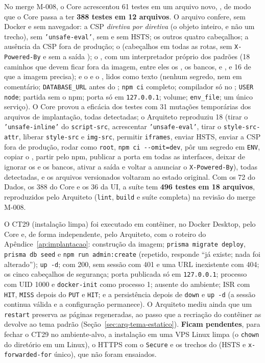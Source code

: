 No merge M-008, o Core acrescentou 61 testes em um arquivo novo, , de modo que o Core passa a ter \textbf{388 testes em 12 arquivos}. O arquivo confere, sem Docker e sem navegador: a CSP \emph{diretiva por diretiva} (o objeto inteiro, e não um trecho), sem \texttt{'unsafe-eval'}, sem  e sem HSTS; os outros quatro cabeçalhos; a ausência da CSP fora de produção; o  (cabeçalhos em todas as rotas, sem \texttt{X-Powered-By} e sem a saída ); o , com um interpretador próprio dos padrões (18 caminhos que devem ficar fora da imagem, entre eles os , os bancos,  e , e 16 de que a imagem precisa); e o  e o , lidos como texto (nenhum segredo, nem em comentário; \texttt{DATABASE\_URL} antes do ; \texttt{npm ci} completo; compilador só no ; \texttt{USER node}; partida sem o npm; porta só em \texttt{127.0.0.1}; volume; \texttt{env\_file}; um único serviço). O Core provou a eficácia dos testes com 31 mutações temporárias dos arquivos de implantação, todas detectadas; o Arquiteto reproduziu 18 (tirar o \texttt{'unsafe-inline'} do \texttt{script-src}, acrescentar \texttt{'unsafe-eval'}, tirar o \texttt{style-src-attr}, liberar \texttt{style-src} e \texttt{img-src}, permitir \texttt{iframes}, enviar HSTS, enviar a CSP fora de produção, rodar como \texttt{root}, \texttt{npm ci -{}-omit=dev}, pôr um segredo em \texttt{ENV}, copiar o , partir pelo npm, publicar a porta em todas as interfaces, deixar de ignorar os  e os bancos, ativar a saída  e voltar a anunciar o \texttt{X-Powered-By}), todas detectadas, e os arquivos versionados voltaram ao estado original. Com os 72 do Dados, os 388 do Core e os 36 da UI, a suíte tem \textbf{496 testes em 18 arquivos}, reproduzidos pelo Arquiteto (\texttt{lint}, \texttt{build} e suíte completa) na revisão do merge M-008.

O CT29 (instalação limpa) foi executado em contêiner, no Docker Desktop, pelo Core e, de forma independente, pelo Arquiteto, com o roteiro do Apêndice~\ref{ap:implantacao}: construção da imagem; \texttt{prisma migrate deploy}, \texttt{prisma db seed} e \texttt{npm run admin:create} (repetido, responde ``já existe; nada foi alterado''); \texttt{up -d};  com 200,  sem sessão com 401 e uma URL inexistente com 404; os cinco cabeçalhos de segurança; porta publicada só em \texttt{127.0.0.1}; processo com UID 1000 e \texttt{docker-init} como processo 1;  ausente do ambiente; ISR com \texttt{HIT}, \texttt{MISS} depois do \texttt{PUT} e \texttt{HIT}; e a persistência depois de \texttt{down} e \texttt{up -d} (a sessão continua válida e a configuração permanece). O Arquiteto mediu ainda que um \texttt{restart} preserva as páginas regeneradas, ao passo que a recriação do contêiner as devolve ao tema padrão (Seção~\ref{sec:arq-tema-estatico}). \textbf{Ficam pendentes}, para fechar o CT29 no ambiente-alvo, a instalação em uma VPS Linux limpa (o \texttt{chown} do diretório  em um  Linux), o HTTPS com o  \texttt{Secure} e os trechos do  (HSTS e \texttt{x-forwarded-for} único), que não foram ensaiados.

